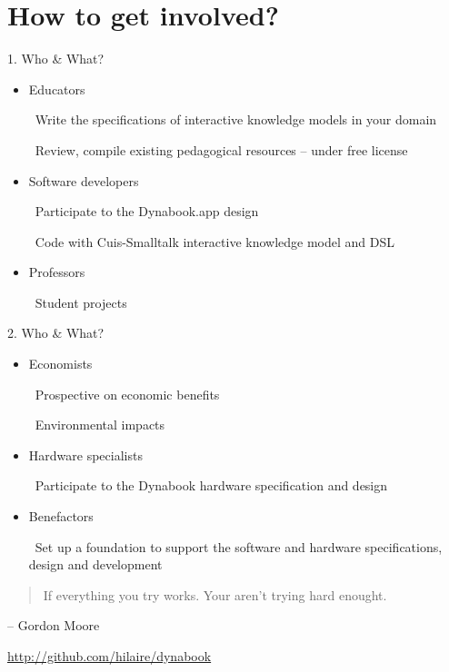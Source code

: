\documentclass{beamer}
\newcommand{\tip}{\boldmath{\textcolor{red}{$\Rightarrow$}}}
\begin{document}
\section{How to get involved?}
\begin{frame}{1. Who \& What?}
  \begin{itemize}
  \item Educators

    \tip\ Write the specifications of interactive knowledge models in
    your domain

    \tip\ Review, compile existing pedagogical resources -- under free
    license
  \vspace*{10pt}

  \item Software developers

    \tip\ Participate to the Dynabook.app design
    
    \tip\ Code with Cuis-Smalltalk interactive knowledge model and DSL
  \vspace*{10pt}
    
  \item Professors

    \tip\ Student projects
  \end{itemize}
\end{frame}
%
\begin{frame}{2. Who \& What?}
  \begin{itemize}
  \item Economists

    \tip\ Prospective on economic benefits

    \tip\ Environmental impacts
  \vspace*{10pt}

  \item Hardware specialists

    \tip\ Participate to the Dynabook hardware specification and
    design
  \vspace*{10pt}

  \item Benefactors

    \tip\ Set up a foundation to support the software and hardware
    specifications, design and development
    
  \end{itemize}
\end{frame}
%
\begin{frame}
  \begin{quote}
    If everything you try works. Your aren't trying hard enought.
      \end{quote}
  \begin{flushright}
    -- Gordon Moore
  \end{flushright}
  \begin{center}
    \url{http://github.com/hilaire/dynabook}
  \end{center}
\end{frame}
\end{document}
